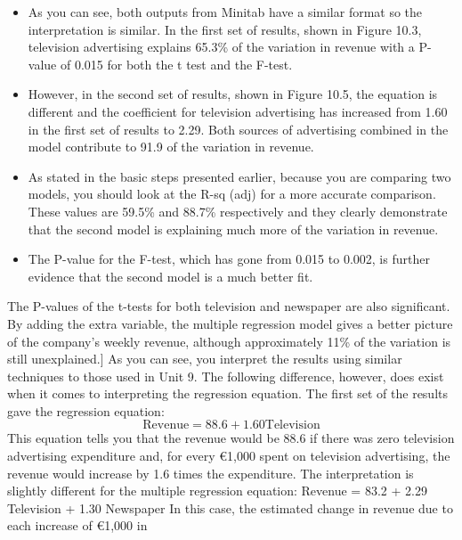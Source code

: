 \documentclass[]{report}
\begin{document}
\begin{itemize}
	\item As you can see, both outputs from Minitab have a similar format so the interpretation
	is similar. In the first set of results, shown in Figure 10.3, television advertising explains
	65.3\% of the variation in revenue with a P-value of 0.015 for both the t test and the
	F-test.
	
\item However, in the second set of results, shown in Figure 10.5, the equation is different and
	the coefficient for television advertising has increased from 1.60 in the first set of
	results to 2.29. Both sources of advertising combined in the model contribute to 91.9%
	of the variation in revenue.
\item As stated in the basic steps presented earlier, because you are comparing two models,
	you should look at the R-sq (adj) for a more accurate comparison. These values are
	59.5\% and 88.7\% respectively and they clearly demonstrate that the second model is
	explaining much more of the variation in revenue.
\item  The P-value for the F-test, which has
	gone from 0.015 to 0.002, is further evidence that the second model is a much better
	fit.
\end{itemize}


The P-values of the t-tests for both television and newspaper are also significant. By
adding the extra variable, the multiple regression model gives a better picture of the
company’s weekly revenue, although approximately 11\% of the variation is still
unexplained.]
As you can see, you interpret the results using similar techniques to those used in Unit
9. The following difference, however, does exist when it comes to interpreting the
regression equation.
The first set of the results gave the regression equation:
\[ \mbox{Revenue} = 88.6 + 1.60 \mbox{Television}\]
This equation tells you that the revenue would be 88.6 if there was zero television
advertising expenditure and, for every €1,000 spent on television advertising, the
revenue would increase by 1.6 times the expenditure.
The interpretation is slightly different for the multiple regression equation:
Revenue = 83.2 + 2.29 Television + 1.30 Newspaper
In this case, the estimated change in revenue due to each increase of €1,000 in
\end{document}

